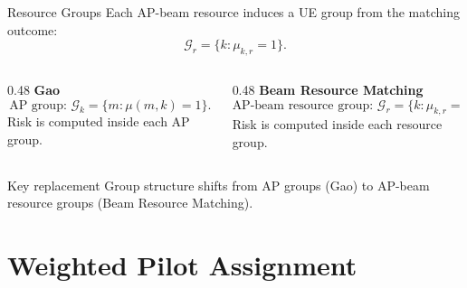 \documentclass[10pt,aspectratio=169]{beamer}
\newcommand{\BRM}{Beam Resource Matching}
\begin{document}
\begin{frame}{Resource Groups}
    \small
    Each AP-beam resource induces a UE group from the matching outcome:
    \[
        \mathcal{G}_r=\{k:\mu_{k,r}=1\}.
    \]

    \vspace{0.5em}
    \begin{columns}[T,onlytextwidth]
        \begin{column}{0.48\textwidth}
            \textbf{Gao}
            \[
                \text{AP group: }
                \mathcal{G}_k=\{m:\mu(m,k)=1\}.
            \]
            Risk is computed inside each AP group.
        \end{column}
        \begin{column}{0.48\textwidth}
            \textbf{\BRM{}}
            \[
                \text{AP-beam resource group: }
                \mathcal{G}_r=\{k:\mu_{k,r}=1\}.
            \]
            Risk is computed inside each resource group.
        \end{column}
    \end{columns}

    \vspace{0.7em}
    \begin{block}{Key replacement}
        Group structure shifts from AP groups (Gao) to AP-beam resource groups (\BRM{}).
    \end{block}
\end{frame}

\section{Weighted Pilot Assignment}
\end{document}
